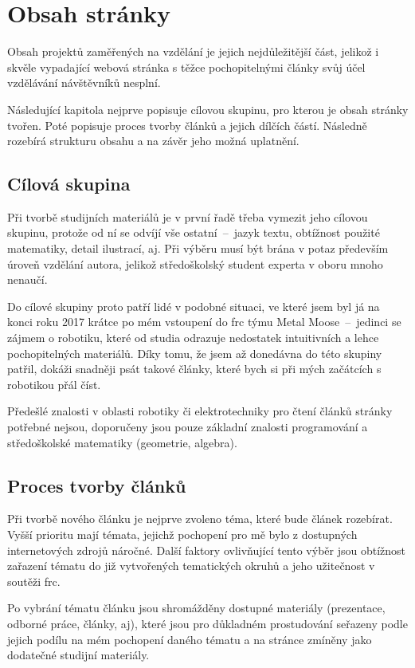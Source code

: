 \documentclass[a4paper, 12pt, twoside]{article}
\begin{document}
  \section{Obsah stránky}
  Obsah projektů zaměřených na vzdělání je jejich nejdůležitější část, jelikož i skvěle vypadající webová stránka s těžce pochopitelnými články svůj účel vzdělávání návštěvníků nesplní.

  Následující kapitola nejprve popisuje cílovou skupinu, pro kterou je obsah stránky tvořen. Poté popisuje proces tvorby článků a jejich dílčích částí. Následně rozebírá strukturu obsahu a na závěr jeho možná uplatnění.


  \subsection{Cílová skupina}
  Při tvorbě studijních materiálů je v první řadě třeba vymezit jeho cílovou skupinu, protože od ní se odvíjí vše ostatní~--~jazyk textu, obtížnost použité matematiky, detail ilustrací, aj. Při výběru musí být brána v potaz především úroveň vzdělání autora, jelikož středoškolský student experta v oboru mnoho nenaučí.

  Do cílové skupiny proto patří lidé v podobné situaci, ve které jsem byl já na konci roku 2017 krátce po mém vstoupení do \gls{frc} týmu Metal Moose~--~jedinci se zájmem o robotiku, které od studia odrazuje nedostatek intuitivních a lehce pochopitelných materiálů. Díky tomu, že jsem až donedávna do této skupiny patřil, dokáži snadněji psát takové články, které bych si při mých začátcích s robotikou přál číst.

  Předešlé znalosti v oblasti robotiky či elektrotechniky pro čtení článků stránky potřebné nejsou, doporučeny jsou pouze základní znalosti programování a středoškolské matematiky (geometrie, algebra).


  \subsection{Proces tvorby článků} \label{sec:Proces tvorby článků}
  Při tvorbě nového článku je nejprve zvoleno téma, které bude článek rozebírat. Vyšší prioritu mají témata, jejichž pochopení pro mě bylo z dostupných internetových zdrojů náročné. Další faktory ovlivňující tento výběr jsou obtížnost zařazení tématu do již vytvořených tematických okruhů a jeho užitečnost v soutěži \gls{frc}.

  Po vybrání tématu článku jsou shromážděny dostupné materiály (prezentace, odborné práce, články, aj), které jsou pro důkladném prostudování seřazeny podle jejich podílu na mém pochopení daného tématu a na stránce zmíněny jako dodatečné studijní materiály.
\end{document}
